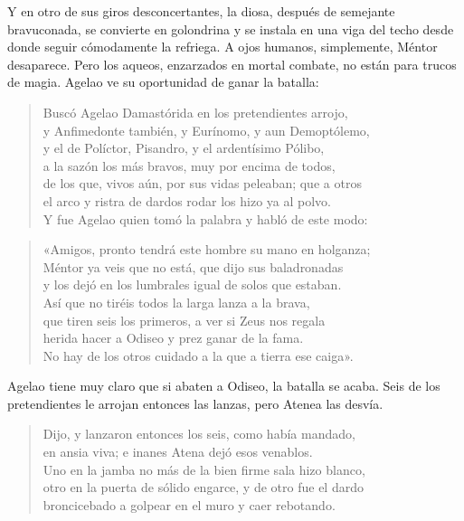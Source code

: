 Y en otro de sus giros desconcertantes, la diosa, después de semejante bravuconada, se convierte en golondrina y se instala en una viga del techo desde donde seguir cómodamente la refriega. A ojos humanos, simplemente, Méntor desaparece. Pero los aqueos, enzarzados en mortal combate, no están para trucos de magia. Agelao ve su oportunidad de ganar la batalla:

\begin{verse}
Buscó Agelao Damastórida en los pretendientes arrojo,\\
y Anfimedonte también, y Eurínomo, y aun Demoptólemo,\\
y el de Políctor, Pisandro, y el ardentísimo Pólibo,\\
a la sazón los más bravos, muy por encima de todos,\\
de los que, vivos aún, por sus vidas peleaban; que a otros\\
el arco y ristra de dardos rodar los hizo ya al polvo.\\
Y fue Agelao quien tomó la palabra y habló de este modo:
\end{verse}

\begin{verse}
«Amigos, pronto tendrá este hombre su mano en holganza;\\
Méntor ya veis que no está, que dijo sus baladronadas\\
y los dejó en los lumbrales igual de solos que estaban.\\
Así que no tiréis todos la larga lanza a la brava,\\
que tiren seis los primeros, a ver si Zeus nos regala\\
herida hacer a Odiseo y prez ganar de la fama.\\
No hay de los otros cuidado a la que a tierra ese caiga».
\end{verse}

Agelao tiene muy claro que si abaten a Odiseo, la batalla se acaba. Seis de los pretendientes le arrojan entonces las lanzas, pero Atenea las desvía.

\begin{verse}
Dijo, y lanzaron entonces los seis, como había mandado,\\
en ansia viva; e inanes Atena dejó esos venablos.\\
Uno en la jamba no más de la bien firme sala hizo blanco,\\
otro en la puerta de sólido engarce, y de otro fue el dardo\\
broncicebado a golpear en el muro y caer rebotando.
\end{verse}

